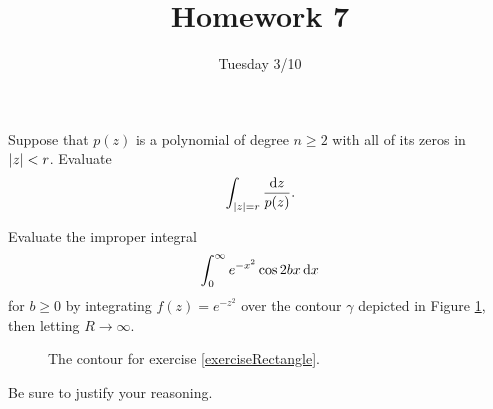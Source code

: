 \documentclass{../math135}
\title{Homework 7}
\author{}
\date{Tuesday 3/10}
\begin{document}
\begin{exercise}
	Suppose that \(p(z)\) is a polynomial of degree \(n \geq 2\) with
  all of its zeros in \(\lvert z\rvert < r\).  Evaluate
  \[
		\int_{\lvert z\rvert=r} \frac{\mathop{}\!\mathrm d z}{p(z)}.
  \]

  \begin{solution}

  \end{solution}
\end{exercise}


\begin{exercise}\label{exerciseRectangle}
	Evaluate the improper integral
  \[
		\int_0^\infty e^{-x^2} \cos 2bx \mathop{}\!\mathrm d x
  \]
	for \(b \ge 0\) by integrating \(f(z) = e^{-z^2}\) over the contour
  \(\gamma\) depicted in Figure \ref{fig:rect}, then letting
  \(R \to \infty\).
	\begin{figure}[h]
    \begin{center}
    \end{center}
		\caption{The contour for exercise \ref{exerciseRectangle}.}
		\label{fig:rect}
	\end{figure}
	Be sure to justify your reasoning.

  \begin{solution}

  \end{solution}
\end{exercise}
\end{document}
